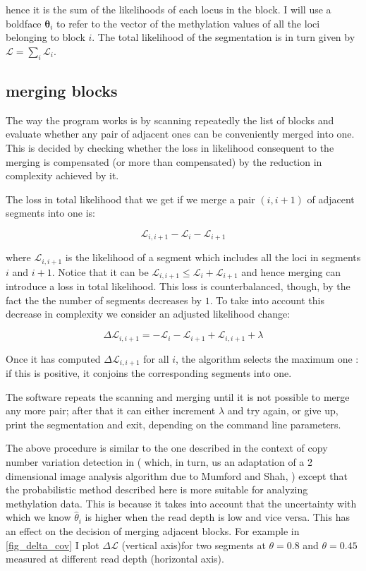 \documentclass[12pt]{amsart}
\newcommand{\lik}{\ensuremath{\mathcal{L}}}
\begin{document}
hence it is the sum of the likelihoods of each locus in the block. I will use a boldface
$\pmb{\theta}_i$ to refer to the vector of the methylation values of all the loci belonging to 
block $i$.
The total likelihood of the segmentation is in turn given by 
$\mathcal{L}=\sum_i\mathcal{L}_i$.

\subsection{merging blocks}

The way the program works is by 
scanning repeatedly the list of blocks and evaluate whether any pair 
of adjacent ones can be conveniently merged into one.  
This is decided by checking whether the loss in 
likelihood consequent to the merging is compensated 
(or more than compensated)
by the reduction in complexity achieved by it.

The loss in 
total likelihood that we get if we merge a pair $(i,i+1)$ of 
adjacent segments into one is:

\[\mathcal{L}_{i,i+1}-\mathcal{L}_i-\mathcal{L}_{i+1}\]

where $\mathcal{L}_{i,i+1}$ is the likelihood of a segment which includes
all the loci in segments $i$ and $i+1$.
Notice that it can be  $\mathcal{L}_{i,i+1} \leq \mathcal{L}_i+\mathcal{L}_{i+1}$ and hence merging  
can introduce a loss in total 
likelihood. This loss is counterbalanced, though, by the fact the the number 
of segments decreases by $1$. To take into account this decrease in 
complexity we consider an adjusted likelihood change:

\[\Delta  \lik_{i,i+1} = -\mathcal{L}_i-\mathcal{L}_{i+1}+\mathcal{L}_{i,i+1} + \lambda\]

Once it has computed 
$\Delta  \lik_{i,i+1}$ for all $i$, the algorithm selects the maximum 
one : if this is positive, it conjoins the corresponding segments into one.

The software repeats the scanning and merging until it is not possible to 
merge any more pair; after that it can either increment $\lambda$ and try again, 
or give up, print the segmentation and exit, depending on the command line parameters.

The above procedure is similar to the one
described in the context of copy number variation detection in \cite{vega} 
( which, in turn, us an adaptation 
of a 2 dimensional image analysis algorithm due to Mumford and Shah, 
\cite{mumfordshah}) except that the probabilistic method  described
here is more suitable for analyzing methylation data. This is because it takes into account 
that the
uncertainty with which we know $\hat{\theta}_i$ is higher when the read depth is low and vice versa.
This has an effect on the decision of merging adjacent blocks. For example in \ref{fig_delta_cov} I plot
$\Delta  \lik$  (vertical axis)for two segments at $\theta=0.8$ and $\theta=0.45$ measured at different read depth
(horizontal axis).
\end{document}
